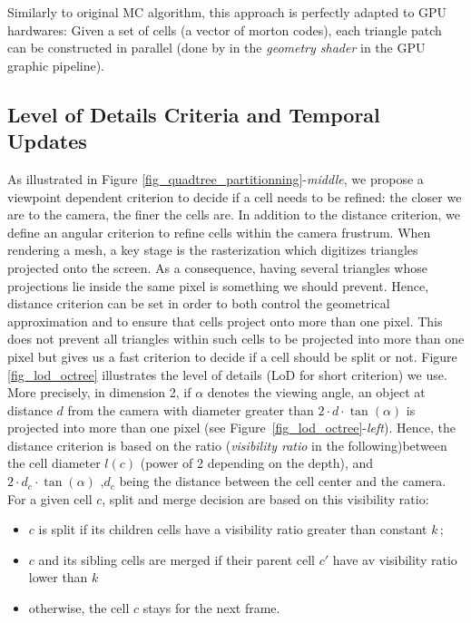 \documentclass{llncs}
\begin{document}
Similarly to original MC algorithm, this approach is perfectly adapted
to GPU hardwares: Given a set of cells (a vector of morton codes),
each triangle patch can be constructed in parallel (done by
in the \emph{geometry shader} in the GPU graphic pipeline).

\subsection{Level of Details Criteria and Temporal Updates}


As illustrated in Figure
\ref{fig_quadtree_partitionning}-\emph{middle}, we propose a viewpoint
dependent criterion to decide if a cell needs to be refined: the
closer we are to the camera, the finer the cells are. In addition to
the distance criterion, we define an angular criterion to refine cells
within the camera frustrum. When rendering a mesh, a key stage is the
rasterization which digitizes triangles projected onto the
screen. As a consequence, having several triangles whose projections
lie inside the same pixel is something we should prevent. Hence,
distance criterion can be set in order to both control the geometrical
approximation and to ensure that cells project onto more than one
pixel. This does not prevent all triangles within such cells to be
projected into more than one pixel but gives us a fast criterion to
decide if a cell should be split or not.  Figure \ref{fig_lod_octree}
illustrates the level of details (LoD for short criterion) we
use. More precisely, in dimension 2, if $\alpha$ denotes the viewing
angle, an object at distance $d$ from the camera with diameter greater than
 $2\cdot d\cdot\tan(\alpha)$
 is projected into more than one pixel
(see Figure~\ref{fig_lod_octree}-\emph{left}). Hence, the distance
criterion is based on the ratio (\emph{visibility ratio} in the
following)between the cell diameter $l(c)$ (power of 2 depending on
the depth), and
$2\cdot d_c\cdot\tan(\alpha)$ 
,$d_c$ being the distance between the cell center and the camera. For a given cell $c$,
split and merge decision are based on this visibility ratio:
\begin{itemize}
\item $c$ is split if its children cells have a visibility ratio
  greater than  constant $k$\,;
\item $c$ and its sibling cells are merged if their parent cell $c'$
  have av visibility ratio lower than $k$\;
\item otherwise, the cell $c$ stays for the next frame.
\end{itemize}
\end{document}
